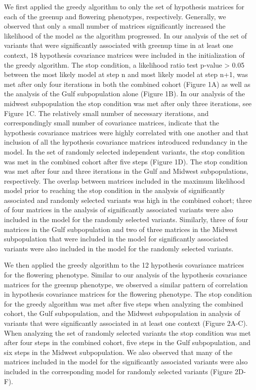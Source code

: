 \documentclass[
  letterpaper,
  DIV=11,
  numbers=noendperiod]{scrartcl}
\begin{document}
We first applied the greedy algorithm to only the set of hypothesis
matrices for each of the greenup and flowering phenotypes, respectively.
Generally, we observed that only a small number of matrices
significantly increased the likelihood of the model as the algorithm
progressed. In our analysis of the set of variants that were
significantly associated with greenup time in at least one context, 18
hypothesis covariance matrices were included in the initialization of
the greedy algorithm. The stop condition, a likelihood ratio test
p-value \textgreater{} 0.05 between the most likely model at step n and
most likely model at step n+1, was met after only four iterations in
both the combined cohort (Figure 1A) as well as the analysis of the Gulf
subpopulation alone (Figure 1B). In our analysis of the midwest
subpopulation the stop condition was met after only three iterations,
see Figure 1C. The relatively small number of necessary iterations, and
correspondingly small number of covariance matrices, indicate that the
hypothesis covariance matrices were highly correlated with one another
and that inclusion of all the hypothesis covariance matrices introduced
redundancy in the model. In the set of randomly selected independent
variants, the stop condition was met in the combined cohort after five
steps (Figure 1D). The stop condition was met after four and three
iterations in the Gulf and Midwest subpopulations, respectively. The
overlap between matrices included in the maximum likelihood model prior
to reaching the stop condition in the analysis of significantly
associated and randomly selected variants was high in the combined
cohort; three of four matrices in the analysis of significantly
associated variants were also included in the model for the randomly
selected variants. Similarly, three of four matrices in the Gulf
subpopulation and two of three matrices in the Midwest subpopulation
that were included in the model for significantly associated variants
were also included in the model for the randomly selected variants.~

\hfill\break

We then applied the greedy algorithm to the 12 hypothesis covariance
matrices for the flowering phenotype. Similar to our analysis of the
hypothesis covariance matrices for the greenup phenotype, we observed a
similar pattern of correlation in hypothesis covariance matrices for the
flowering phenotype. The stop condition for the greedy algorithm was met
after five steps when analyzing the combined cohort, the Gulf
subpopulation, and the Midwest subpopulation in analysis of variants
that were significantly associated in at least one context (Figure
2A-C). When analyzing the set of randomly selected variants the stop
condition was met after four steps in the combined cohort, five steps in
the Gulf subpopulation, and six steps in the Midwest subpopulation. We
also observed that many of the matrices included in the model for the
significantly associated variants were also included in the
corresponding model for randomly selected variants (Figure 2D-F).~
\end{document}
